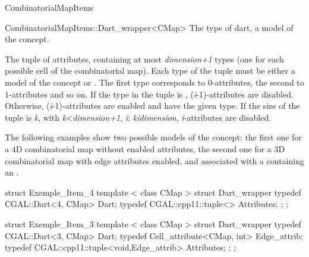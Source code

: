 \begin{ccRefConcept}{CombinatorialMapItems}
\begin{ccClass}{CombinatorialMapItems::Dart_wrapper<CMap>}
    {The type of dart, a model of the  concept.}

{The tuple of attributes, containing at most
  \emph{dimension+1} types (one for each possible cell of the combinatorial
  map).  Each type of the tuple must be either a model of the
   concept or .
  The first type corresponds to 0-attributes, 
  the second to 1-attributes and so on. 
  If the  type in the tuple is , 
  (\emph{i}-1)-attributes are disabled. Otherwise, (\emph{i}-1)-attributes are enabled and
  have the given type.  If the size of the tuple is \emph{k},
  with \emph{k}<\emph{dimension+1}, 
  \myforall{}\emph{i}: \emph{k}\myleq{}\emph{i}\myleq{}\emph{dimension},
  \emph{i}-attributes are disabled.}
\end{ccClass}

\ccExample
The following examples show two possible models of the
 concept: the first one for a 4D
combinatorial map without enabled attributes, the second one for a 3D
combinatorial map with edge attributes enabled, and associated with a
 containing an .

\begin{ccExampleCode}
struct Exemple_Item_4
{
   template < class CMap >
   struct Dart_wrapper
   {
     typedef CGAL::Dart<4, CMap> Dart;
     typedef CGAL::cpp11::tuple<> Attributes;
   };
};
\end{ccExampleCode}

\begin{ccExampleCode}
struct Exemple_Item_3
{
   template < class CMap >
   struct Dart_wrapper
   {
     typedef CGAL::Dart<3, CMap> Dart;
     typedef Cell_attribute<CMap, int> Edge_attrib;
     typedef CGAL::cpp11::tuple<void,Edge_attrib> Attributes;
   };
};
\end{ccExampleCode}    

\ccHasModels
{}

\ccSeeAlso
\\

\end{ccRefConcept}
\ccRefPageEnd

